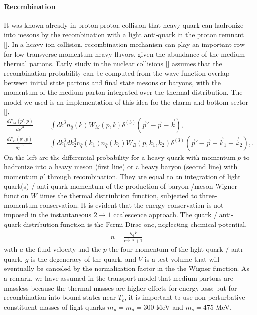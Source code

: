 \paragraph{Recombination}
It was known already in proton-proton collision that heavy quark can hadronize into mesons by the recombination with a light anti-quark in the proton remnant [].
In a heavy-ion collision, recombination mechanism can play an important row for low transverse momentum heavy flavors, given the abundance of the medium thermal partons.
Early study in the nuclear collisions [] assumes that the recombination probability can be computed from the wave function overlap between initial state partons and final state mesons or baryons, with the momentum of the medium parton integrated over the thermal distribution.
The model we used is an implementation of this idea for the charm and bottom sector [],
\begin{eqnarray}
\frac{dP_M(p', p)}{dp'^3} &=& \int dk^3 n_{\bar{q}}(k) W_{M}(p, k)\delta^{(3)}(\vec{p}'-\vec{p}-\vec{k}), \label{eq:meson_recombine}\\
\frac{dP_B(p', p)}{dp'^3} &=& \int dk_1^3 dk_2^3 n_{\bar{q}}(k_1)  n_{\bar{q}}(k_2) W_{B}(p, k_1, k_2)\delta^{(3)}(\vec{p}'-\vec{p}-\vec{k}_1 - \vec{k}_2), \label{eq:baryon_recombine}.
\end{eqnarray}
On the left are the differential probability for a heavy quark with momentum $p$ to hadronize into a heavy meson (first line) or a heavy baryon (second line) with momentum $p'$ through recombination.
They are equal to an integration of light quark(s) / anti-quark momentum  of the production of baryon /meson Wigner function $W$ times the thermal distriubtion function, subjected to three-momentum conservation.
It is evident that the energy conservation is not imposed in the instantaneous $2\rightarrow 1$ coalescence approach.
The quark / anti-quark distribution function is the Fermi-Dirac one, neglecting chemical potential, 
\begin{eqnarray}
n = \frac{g_q V}{e^{\beta p\cdot u} + 1}
\end{eqnarray}
with $u$ the fluid velocity and the $p$ the four momentum of the light quark / anti-quark.
$g$ is the degeneracy of the quark, and $V$ is a test volume that will eventually be canceled by the normalization factor in the the Wigner function.
As a remark, we have assumed in the transport model that medium partons are massless because the thermal masses are higher effects for energy loss; but for recombination into bound states near $T_c$, it is important to use non-perturbative constituent masses of light quarks $m_u = m_d = 300$ MeV and $m_s = 475$ MeV.

